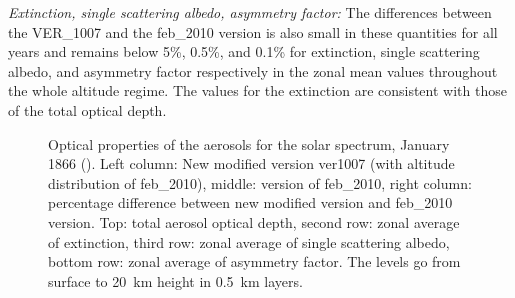 \begin{appendix}
{\it Extinction, single scattering albedo, asymmetry factor:} The
differences between the VER\_1007 and the feb\_2010 version is also small in
these quantities for all years and remains below 5\%, 0.5\%, and 0.1\%
for extinction, single scattering albedo, and asymmetry factor
respectively in the zonal mean values throughout the whole altitude
regime. The values for the extinction are consistent with those of the
total optical depth. 

\begin{figure}[ht]
\vspace{-3.5cm}
\pctsixt
{\vspace{-0.7cm}}
{\vspace{-0.7cm}\hspace{-3cm}}
{\vspace{-0.7cm}\hspace{-3cm}}
{\vspace{-1.0cm}}
{\vspace{-1.0cm}\hspace{-3cm}}
{\vspace{-1.0cm}\hspace{-3cm}}
\pctsixt
{\vspace{-0.7cm}}
{\vspace{-0.7cm}\hspace{-3cm}}
{\vspace{-0.7cm}\hspace{-3cm}}
{}
{\hspace{-3cm}}
{\hspace{-3cm}}
\caption{Optical properties of the aerosols for the solar spectrum,
  January 1866 (). Left column: New modified version
  ver1007 (with 
  altitude distribution of feb\_2010), middle: version of feb\_2010, right
  column: percentage difference between new modified version and
  feb\_2010 version. Top: total aerosol optical depth, second row: zonal
  average of extinction, third row: zonal average of single scattering
  albedo, bottom row: zonal average of asymmetry factor. The levels go
from surface to 20~km height in 0.5~km layers.}\label{figopt1866}
\end{figure}


\end{appendix}
